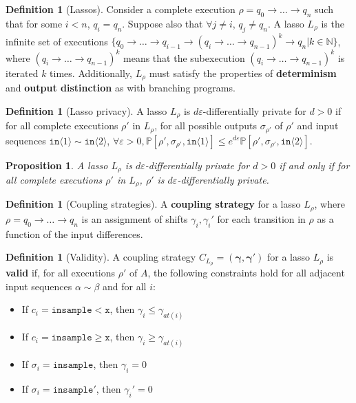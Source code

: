\documentclass[12pt]{article}
\newcommand{\NN}{\mathbb{N}}
\newcommand{\PP}{\mathbb{P}}
\newcommand{\gguard}[1][x]{\texttt{insample}\geq #1}
\newcommand{\lguard}[1][x]{\texttt{insample} < #1}
\newcommand{\brangle}[1]{\langle #1 \rangle}
\newtheorem{prop}[thm]{Proposition}
\theoremstyle{definition}
\newtheorem{defn}[thm]{Definition}
\begin{document}
\begin{defn}[Lassos]
    Consider a complete execution $\rho = q_0\to\ldots \to q_n$ such that for some $i<n$, $q_i = q_n$. Suppose also that $\forall j\neq i$, $q_j \neq q_n$. A lasso $L_\rho$ is the infinite set of executions $\{q_0\to\ldots\to q_{i-1}\to (q_i\to\ldots\to q_{n-1})^k\to q_n| k\in \NN\}$, where $(q_i\to\ldots\to q_{n-1})^k$ means that the subexecution $(q_i\to\ldots\to q_{n-1})^k$ is iterated $k$ times. 
    Additionally, $L_\rho$ must satisfy the properties of \textbf{determinism} and \textbf{output distinction} as with branching programs.
\end{defn}

\begin{defn}[Lasso privacy]
    A lasso $L_\rho$ is $d\varepsilon$-differentially private for $d>0$ if for all complete executions $\rho'$ in $L_\rho$, for all possible outputs $\sigma_{\rho'}$ of $\rho'$ and input sequences $\texttt{in}\brangle{1}\sim \texttt{in}\brangle{2}$, $\forall \varepsilon>0, \PP[\rho', \sigma_{\rho'}, \texttt{in}\brangle{1}]\leq e^{d\varepsilon}\PP[\rho', \sigma_{\rho'}, \texttt{in}\brangle{2}]$.
\end{defn}

\begin{prop}
    A lasso $L_\rho$ is $d\varepsilon$-differentially private for $d>0$ if and only if for all complete executions $\rho'$ in $L_\rho$, $\rho'$ is $d\varepsilon$-differentially private. 
\end{prop}

\begin{defn}[Coupling strategies]
    A \textbf{coupling strategy} for a lasso $L_\rho$, where $\rho=q_0\to\ldots \to q_n$ is an assignment of shifts $\gamma_i, \gamma_i'$ for each transition in $\rho$ as a function of the input differences. 
\end{defn}

\begin{defn}[Validity]
    A coupling strategy $C_{L_\rho}=(\bm{\gamma}, \bm{\gamma}')$ for a lasso $L_\rho$ is \textbf{valid} if, for all executions $\rho'$ of $A$, the following constraints hold for all adjacent input sequences $\alpha\sim\beta$ and for all $i$:
    \begin{itemize}
        \item If $c_i = \lguard[\texttt{x}]$, then $\gamma_i\leq\gamma_{at(i)}$
        \item If $c_i = \gguard[\texttt{x}]$, then $\gamma_i\geq\gamma_{at(i)}$
        \item If $\sigma_i = \texttt{insample}$, then $\gamma_i=0$
        \item If $\sigma_i = \texttt{insample}'$, then $\gamma_i'=0$
    \end{itemize}
\end{defn}
\end{document}
